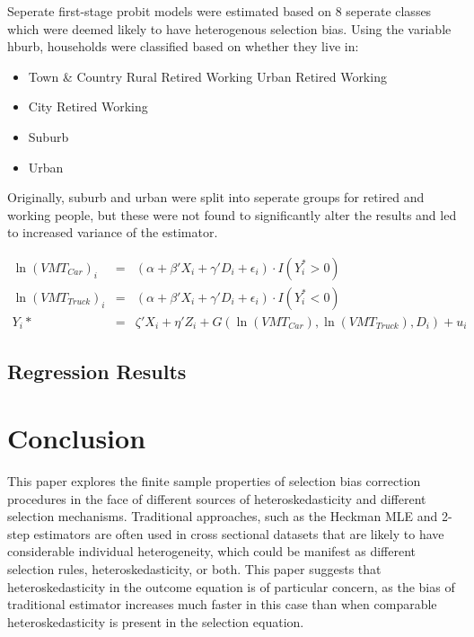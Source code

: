 \documentclass{article}
\begin{document}
Seperate first-stage probit models were estimated based on 8 seperate classes which were deemed likely to have heterogenous selection bias.  Using the variable hburb, households were classified based on whether they live in:

\begin{itemize}
    \item Town \& Country
       \subitem Rural
          \subsubitem Retired
          \subsubitem Working
       \subitem Urban
          \subsubitem Retired
          \subsubitem Working
    \item City
       \subitem Retired
       \subitem Working
    \item Suburb
    \item Urban
\end{itemize}

Originally, suburb and urban were split into seperate groups for retired and working people, but these were not found to significantly alter the results and led to increased variance of the estimator.



\begin{eqnarray*}
\ln(VMT_{Car})_i&=&(\alpha + \beta'X_i +\gamma'D_i + \epsilon_i)\cdot I(Y^*_i>0) \\
\ln(VMT_{Truck})_i&=&(\alpha + \beta'X_i +\gamma'D_i + \epsilon_i)\cdot I(Y^*_i<0) \\
Y_i*&=&\zeta'X_i + \eta'Z_i + G(\ln(VMT_{Car}), \ln(VMT_{Truck}), D_i) + u_i
\end{eqnarray*}



\subsection{Regression Results}




\section{Conclusion}

This paper explores the finite sample properties of selection bias correction procedures in the face of different sources of heteroskedasticity and different selection mechanisms.  Traditional approaches, such as the Heckman MLE and 2-step estimators are often used in cross sectional datasets that are likely to have considerable individual heterogeneity, which could be manifest as different selection rules, heteroskedasticity, or both.  This paper suggests that heteroskedasticity in the outcome equation is of particular concern, as the bias of traditional estimator increases much faster in this case than when comparable heteroskedasticity is present in the selection equation.  
\end{document}
